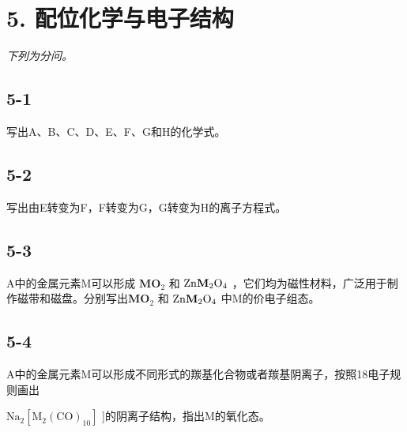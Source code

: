 \section*{5. 配位化学与电子结构}
\textit{下列为分问。}

\subsection*{5-1}
写出A、B、C、D、E、F、G和H的化学式。

\subsection*{5-2}
写出由E转变为F，F转变为G，G转变为H的离⼦⽅程式。

\subsection*{5-3}
A中的⾦属元素M可以形成 $\mathbf { M O } _ { 2 }$ 和 $\mathrm { Z n } { \bf M } _ { 2 } \mathrm { O } _ { 4 }$ ，它们均为磁性材料，⼴泛⽤于制作磁带和磁盘。分别写出$\mathbf { M O } _ { 2 }$ 和 $\mathrm { Z n { \bf M } _ { 2 } O _ { 4 } }$ 中M的价电⼦组态。

\subsection*{5-4}
A中的⾦属元素M可以形成不同形式的羰基化合物或者羰基阴离⼦，按照18电⼦规则画出

$\mathrm { N a _ { 2 } [ M _ { 2 } ( C O ) _ { 1 0 } ] }$ ]的阴离⼦结构，指出M的氧化态。
